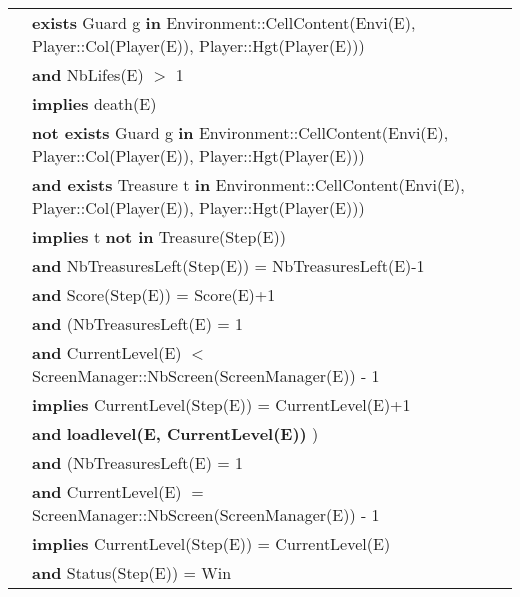 \documentclass[7pt]{article}
\begin{document}
\begin{tabular}{rl}
& \textbf{exists} Guard g \textbf{in} Environment::CellContent(Envi(E), Player::Col(Player(E)), Player::Hgt(Player(E))) \\
& \quad \textbf{and} NbLifes(E) $>$ 1 \\
& \quad \textbf{implies} death(E) \\
   
& \textbf{not exists} Guard g \textbf{in} Environment::CellContent(Envi(E), Player::Col(Player(E)), Player::Hgt(Player(E))) \\
& \quad \textbf{and exists} Treasure t \textbf{in} Environment::CellContent(Envi(E), Player::Col(Player(E)), Player::Hgt(Player(E))) \\
& \quad \textbf{implies} t \textbf{not in} Treasure(Step(E)) \\
& \quad\quad \textbf{and} NbTreasuresLeft(Step(E)) = NbTreasuresLeft(E)-1 \\
& \quad\quad \textbf{and} Score(Step(E)) = Score(E)+1 \\
& \quad\quad \textbf{and} (NbTreasuresLeft(E) = 1 \\
& \quad\quad\quad \textbf{and} CurrentLevel(E) $<$ ScreenManager::NbScreen(ScreenManager(E)) - 1 \\
& \quad\quad\quad \textbf{implies} CurrentLevel(Step(E)) = CurrentLevel(E)+1 \\
& \quad\quad\quad\quad \textbf{and} \textbf{loadlevel(E, CurrentLevel(E))} )\\
& \quad\quad \textbf{and} (NbTreasuresLeft(E) = 1 \\
& \quad\quad\quad \textbf{and} CurrentLevel(E) $=$ ScreenManager::NbScreen(ScreenManager(E)) - 1 \\
& \quad\quad\quad \textbf{implies} CurrentLevel(Step(E)) = CurrentLevel(E) \\
& \quad\quad\quad\quad \textbf{and} Status(Step(E)) = Win \\





\end{tabular}
\newpage
\end{document}
